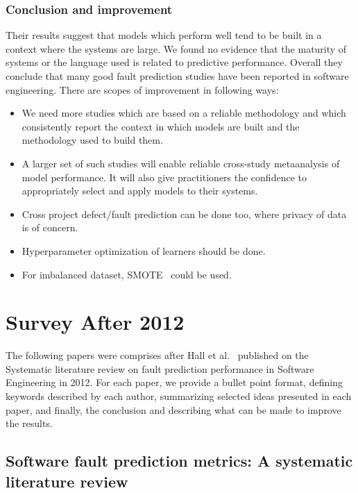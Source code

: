 \documentclass[conference]{IEEEtran}
\begin{document}
\subsubsection{\textbf{Conclusion and improvement}}
Their results suggest that models which perform well tend to be built in a context where the systems are large. We found no evidence that the maturity of systems or
the language used is related to predictive performance. Overall they conclude that many good fault prediction studies have been reported in software engineering.
There are scopes of improvement in following ways:
\begin{itemize}
    \item We need more studies which are based on a reliable methodology and which consistently report the context in which models are built and the methodology used to build them.
    \item A larger set of such studies will enable reliable cross-study metaanalysis of model performance. It will also give practitioners the confidence to appropriately select and apply models to their systems.
    \item Cross project defect/fault prediction can be done too, where privacy of data is of concern.
    \item Hyperparameter optimization of learners should be done.
    \item For imbalanced dataset, SMOTE~\cite{chawla2002smote} could be used.
\end{itemize}

\section{Survey After 2012}
\label{after}
The following papers were comprises after Hall et al.~\cite{hall2012systematic}
published on the Systematic literature review on fault prediction performance in Software Engineering in 2012. For each paper, we  provide a bullet point format, defining keywords described by each author, summarizing selected ideas presented in each paper, and finally, the conclusion and describing what can be made to improve the results.

\subsection{\textbf{Software fault prediction metrics: A systematic literature review~\cite{radjenovic2013software}}}
\end{document}
